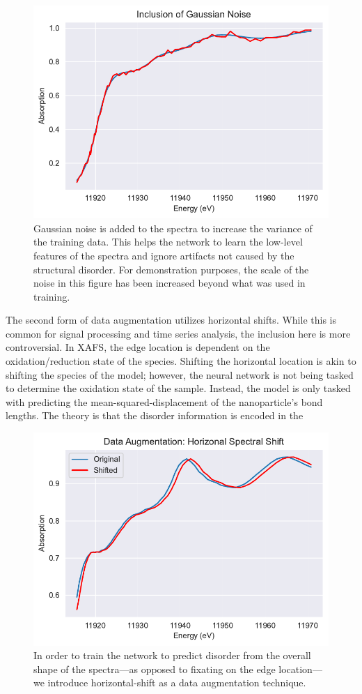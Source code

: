 \begin{figure}
    \centering
    \includegraphics[width=.75\linewidth]{Chapters/Figures/gaussian-noise-data-aug.pdf}
    \caption[Data Augmentation: Gaussian Noise]{Gaussian noise is added to the spectra to increase the variance of the training data. This helps the network to learn the low-level features of the spectra and ignore artifacts not caused by the structural disorder. For demonstration purposes, the scale of the noise in this figure has been increased beyond what was used in training.}
    \label{fig:data-aug-gauss-noise}
\end{figure}

The second form of data augmentation utilizes horizontal shifts. While this is common for signal processing and time series analysis, the inclusion here is more controversial. In XAFS, the edge location is dependent on the oxidation/reduction state of the species. Shifting the horizontal location is akin to shifting the species of the model; however, the neural network is not being tasked to determine the oxidation state of the sample. Instead, the model is only tasked with predicting the mean-squared-displacement of the nanoparticle's bond lengths. The theory is that the disorder information is encoded in the  

\begin{figure}
    \centering
    \includegraphics[width=.75\linewidth]{Chapters/Figures/data-aug-shift-pt75wieght.pdf}
    \caption[Data Augmentation: Horizontal Shift]{In order to train the network to predict disorder from the overall shape of the spectra---as opposed to fixating on the edge location---we introduce horizontal-shift as a data augmentation technique.}
    \label{fig:data-aug-hor}
\end{figure}

